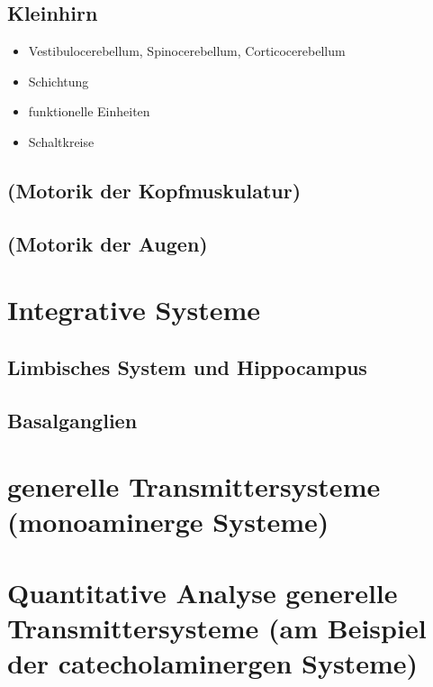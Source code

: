 \documentclass[12pt,a4paper,pdftex]{article}
\begin{document}
\subsection{Kleinhirn}
\begin{itemize}
    \item Vestibulocerebellum, Spinocerebellum, Corticocerebellum 
    \item Schichtung
    \item funktionelle Einheiten
    \item Schaltkreise
\end{itemize}
\subsection{(Motorik der Kopfmuskulatur)}
\subsection{(Motorik der Augen)}

\newpage
\section{Integrative Systeme}
\subsection{Limbisches System und Hippocampus}
\subsection{Basalganglien}

\newpage
\section{generelle Transmittersysteme (monoaminerge Systeme)}
\section{Quantitative Analyse generelle Transmittersysteme (am Beispiel der catecholaminergen Systeme)}
\end{document}
